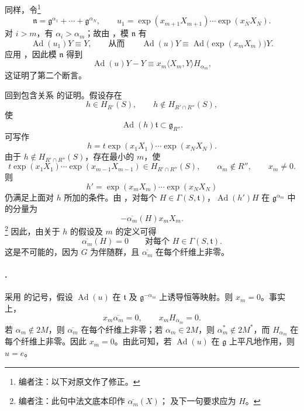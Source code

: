 同样，令\footnote{编者注：以下对原文作了修正。}
\[
  \mathfrak n
  =
  \mathfrak g^{\alpha_1}+\cdots+\mathfrak g^{\alpha_N},
  \qquad
  u_1
  =
  \exp(x_{m+1}X_{m+1})\cdots\exp(x_NX_N).
\]
对 \(i>m\)，有 \(\alpha_i>\alpha_m\)；故由 ，模 \(\mathfrak n\) 有
\[
  \operatorname{Ad}(u_1)Y\equiv Y,
  \qquad\text{从而}\qquad
  \operatorname{Ad}(u)Y
  \equiv
  \operatorname{Ad}\bigl(\exp(x_mX_m)\bigr)Y.
\]
应用 ，因此模 \(\mathfrak n\) 得到
\[
  \operatorname{Ad}(u)Y-Y
  \equiv
  x_m\langle X_m,Y\rangle H_{\alpha_m},
\]
这证明了第二个断言。

回到包含关系 \textup{} 的证明。假设存在
\[
  h\in H_{R'}(S),
  \qquad
  h\notin H_{R'\cap R''}(S),
\]
使
\[
  \operatorname{Ad}(h)\mathfrak t\subset\mathfrak g_{R''}.
\]
可写作
\[
  h=t\exp(x_1X_1)\cdots\exp(x_NX_N).
\]
由于 \(h\notin H_{R'\cap R''}(S)\)，存在最小的 \(m\)，使
\[
  t\exp(x_1X_1)\cdots\exp(x_{m-1}X_{m-1})
  \in H_{R'\cap R''}(S),
  \qquad
  \alpha_m\notin R'',
  \qquad
  x_m\neq0.
\]
则
\[
  h'=\exp(x_mX_m)\cdots\exp(x_NX_N)
\]
仍满足上面对 \(h\) 所加的条件。由 ，对每个 \(H\in\Gamma(S,\mathfrak t)\)，\(\operatorname{Ad}(h')H\) 在 \(\mathfrak g^{\alpha_m}\) 中的分量为
\[
  -\overline{\alpha_m}(H)x_mX_m.
\]
\footnote{编者注：此句中法文底本印作 \(\overline{\alpha_m}(X)\)；\textup{} 及下一句要求应为 \(H\)。}
因此，由关于 \(h\) 的假设及 \(m\) 的定义可得
\[
  \overline{\alpha_m}(H)=0
  \qquad\text{对每个 }H\in\Gamma(S,\mathfrak t).
\]
这是不可能的，因为 \(G\) 为伴随群，且 \(\overline{\alpha_m}\) 在每个纤维上非零。

\paragraph{.}
采用  的记号，假设 \(\operatorname{Ad}(u)\) 在 \(\mathfrak t\) 及 \(\mathfrak g^{-\alpha_m}\) 上诱导恒等映射。则 \(x_m=0\)。事实上，
\[
  x_m\overline{\alpha_m}=0,
  \qquad
  x_mH_{\alpha_m}=0.
\]
若 \(\alpha_m\notin2M\)，则 \(\overline{\alpha_m}\) 在每个纤维上非零；若 \(\alpha_m\in2M\)，则 \(\alpha_m^\ast\notin2M^\ast\)，而 \(H_{\alpha_m}\) 在每个纤维上非零。因此 \(x_m=0\)。由此可知，若 \(\operatorname{Ad}(u)\) 在 \(\mathfrak g\) 上平凡地作用，则 \(u=e\)。

